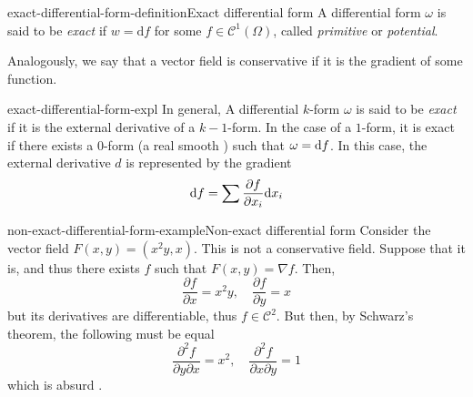 \documentclass[preview]{standalone}
\begin{document}
\begin{snippetdefinition}{exact-differential-form-definition}{Exact differential form}
    A differential form \(\omega\) is said to be \emph{exact} if
    \(w = \text{d}f\) for some \(f \in \mathcal{C}^1(\Omega)\),
    called \emph{primitive} or \emph{potential}.
\end{snippetdefinition}

\begin{plainhtml}
    Analogously, we say that a vector field is conservative if it is the gradient of some function.
\end{plainhtml}

\begin{snippet}{exact-differential-form-expl}
    In general, A differential \(k\)-form \(\omega\) is said to be \emph{exact}
    if it is the external derivative of a \(k-1\)-form.
    In the case of a \(1\)-form, it is exact if there exists a \(0\)-form
    (a real smooth \function) such that \(\omega = \text d f\).
    In this case, the external derivative \(d\) is represented by the gradient
    \[
        \text df = \sum \frac{\partial f}{\partial x_i} \text dx_i
    \]
\end{snippet}

\begin{snippetexample}{non-exact-differential-form-example}{Non-exact differential form}
    Consider the vector field \(F(x,y) = (x^2y, x)\). This is not a conservative field.
    Suppose that it is, and thus there exists \(f\) such that \(F(x,y) = \nabla f\).
    Then,
    \[
        \frac{\partial f}{\partial x} = x^2y, \quad \frac{\partial f}{\partial y} = x
    \]
    but its derivatives are differentiable, thus \(f \in \mathcal{C}^2\).
    But then, by Schwarz's theorem, the following must be equal
    \[
        \frac{\partial^2 f}{\partial y\partial x} = x^2, \quad
        \frac{\partial^2 f}{\partial x\partial y} = 1
    \]
    which is absurd \lightning.
\end{snippetexample}
\end{document}
